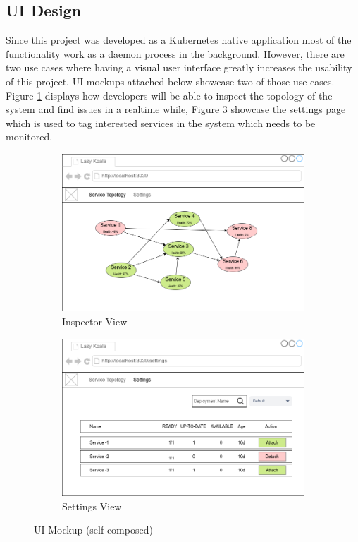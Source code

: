 \subsection{UI Design}

Since this project was developed as a Kubernetes native application most of the functionality work as a daemon process in the background. However, there are two use cases where having a visual user interface greatly increases the usability of this project. UI mockups attached below showcase two of those use-cases. Figure \ref{fig:ui-home} displays how developers will be able to inspect the topology of the system and find issues in a realtime while, Figure \ref{fig:ui-settings} showcase the settings page which is used to tag interested services in the system which needs to be monitored.

\begin{figure}[H]
    \centering
    \begin{subfigure}[b]{0.75\textwidth}
        \centering
        \includegraphics[width=\textwidth]{assets/system-design/ui-home.png}
        \caption{Inspector View}
        \label{fig:ui-home}
    \end{subfigure}
    \hfill
    \begin{subfigure}[b]{0.75\textwidth}
        \centering
        \includegraphics[width=\textwidth]{assets/system-design/ui-settings.png}
        \caption{Settings View}
        \label{fig:ui-settings}
    \end{subfigure}
    \hfill
    \caption{UI Mockup (self-composed)}
\end{figure}
